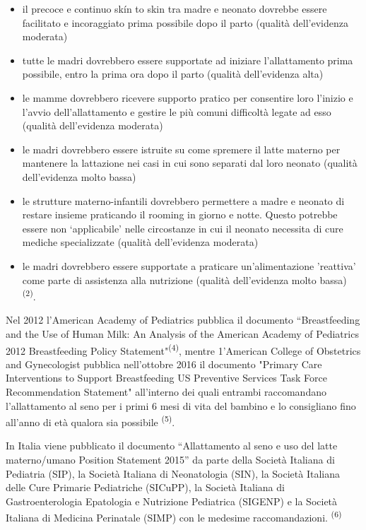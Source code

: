 \documentclass[]{article}
\begin{document}
\begin{itemize}
\item
  il precoce e continuo skín to skin tra madre e neonato dovrebbe essere
  facilitato e incoraggiato prima possibile dopo il parto (qualità
  dell'evidenza moderata)
\item
  tutte le madri dovrebbero essere supportate ad iniziare l'allattamento
  prima possibile, entro la prima ora dopo il parto (qualità
  dell'evidenza alta)
\item
  le mamme dovrebbero ricevere supporto pratico per consentire loro
  l'inizio e l'avvio dell'allattamento e gestire le più comuni
  difficoltà legate ad esso (qualità dell'evidenza moderata)
\item
  le madri dovrebbero essere istruite su come spremere il latte materno
  per mantenere la lattazione nei casi in cui sono separati dal loro
  neonato (qualità dell'evidenza molto bassa)
\item
  le strutture materno-infantili dovrebbero permettere a madre e neonato
  di restare insieme praticando il rooming in giorno e notte. Questo
  potrebbe essere non `applicabile' nelle circostanze in cui il neonato
  necessita di cure mediche specializzate (qualità dell'evidenza
  moderata)
\item
  le madri dovrebbero essere supportate a praticare un'alimentazione
  'reattiva' come parte di assistenza alla nutrizione (qualità
  dell'evidenza molto bassa) \textsuperscript{(2)}.
\end{itemize}

Nel 2012 l'American Academy of Pediatrics pubblica il documento
``Breastfeeding and the Use of Human Milk: An Analysis of the American
Academy of Pediatrics 2012 Breastfeeding Policy
Statement"\textsuperscript{(4)}, mentre 1'American College of Obstetrics
and Gynecologist pubblica nell'ottobre 2016 il documento "Primary Care
Interventions to Support Breastfeeding US Preventive Services Task Force
Recommendation Statement" all'interno dei quali entrambi raccomandano
l'allattamento al seno per i primi 6 mesi di vita del bambino e lo
consigliano fino all'anno di età qualora sia possibile
\textsuperscript{(5)}.

In Italia viene pubblicato il documento ``Allattamento al seno e uso del
latte materno/umano Position Statement 2015'' da parte della Società
Italiana di Pediatria (SIP), la Società Italiana di Neonatologia (SIN),
la Società Italiana delle Cure Primarie Pediatriche (SICuPP), la Società
Italiana di Gastroenterologia Epatologia e Nutrizione Pediatrica
(SIGENP) e la Società Italiana di Medicina Perinatale (SIMP) con le
medesime raccomandazioni. \textsuperscript{(6) }
\end{document}
